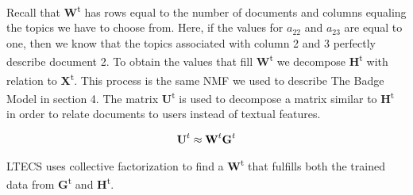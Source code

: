 \documentclass{sig-alternate}
\begin{document}
Recall that \textbf{W}\textsuperscript{t} has rows equal to the number of documents and columns equaling the topics we have to choose from. Here, if the values for $a_{22}$ and $a_{23}$ are equal to one, then we know that the topics associated with column 2 and 3 perfectly describe document 2. To obtain the values that fill \textbf{W}\textsuperscript{t} we decompose \textbf{H}\textsuperscript{t} with relation to \textbf{X}\textsuperscript{t}. This process is the same NMF we used to describe The Badge Model in section 4. The matrix \textbf{U}\textsuperscript{t} is used to decompose a matrix similar to \textbf{H}\textsuperscript{t} in order to relate documents to users instead of textual features.

\begin{equation}
	\textrm{\textbf{U}}^t\approx \textrm{\textbf{W}}^t\textrm{\textbf{G}}^t 
\label{eq:featuresMatix}
\end{equation}

LTECS uses collective factorization to find a \textbf{W}\textsuperscript{t} that fulfills both the trained data from \textbf{G}\textsuperscript{t} and \textbf{H}\textsuperscript{t}.




  
\end{document}
